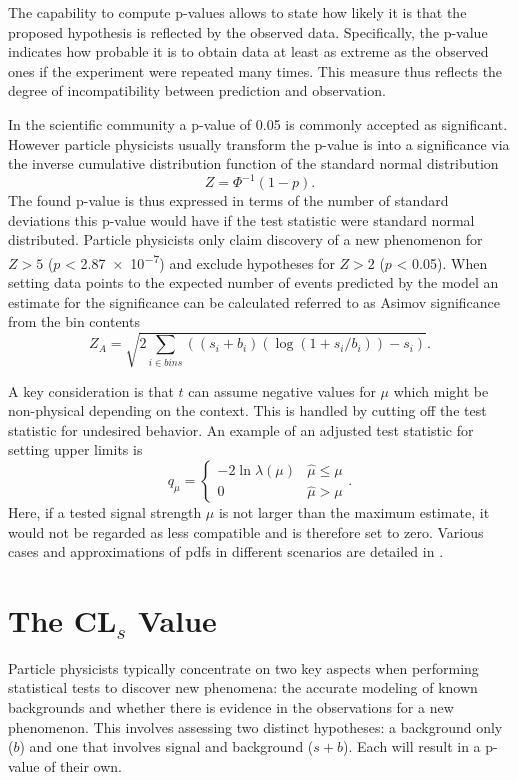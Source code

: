 The capability to compute p-values allows to state how likely it is that the proposed hypothesis is reflected by the observed data. Specifically, the p-value indicates how probable it is to obtain data at least as extreme as the observed ones if the experiment were repeated many times. This measure thus reflects the degree of incompatibility between prediction and observation.

In the scientific community a p-value of 0.05 is commonly accepted as significant. However particle physicists usually transform the p-value is into a significance via the inverse cumulative distribution function of the standard normal distribution
\begin{equation}
    Z = \Phi^{-1}(1 - p).
\end{equation}
The found p-value is thus expressed in terms of the number of standard deviations this p-value would have if the test statistic were standard normal distributed. Particle physicists only claim discovery of a new phenomenon for $Z>5$ ($p$ < \qty{2.87e-7}{}) and exclude hypotheses for $Z>2$ ($p$ < 0.05). When setting data points to the expected number of events predicted by the model an estimate for the significance can be calculated referred to as Asimov significance from the bin contents
\begin{equation}\label{eq:asimov-significance}
    Z_A = \sqrt{2\sum_{i\in bins}((s_i + b_i)(\log{(1 + s_i / b_i)}) - s_i)}.
\end{equation}


A key consideration is that $t$ can assume negative values for $\mu$ which might be non-physical depending on the context. This is handled by cutting off the test statistic for undesired behavior. An example of an adjusted test statistic for setting upper limits is
\begin{equation}
    q_\mu=
    \begin{cases}
        -2\ln \lambda(\mu) & \hat{\mu}\leq\mu \\
        0                  & \hat{\mu}> \mu
    \end{cases}.
\end{equation}
Here, if a tested signal strength $\mu$ is not larger than the maximum estimate, it would not be regarded as less compatible and is therefore set to zero. Various cases and approximations of \acp{pdf} in different scenarios are detailed in \citep{cowan2011asymptotic}.

\section{The CL$_s$ Value}\label{sec:cls}
Particle physicists typically concentrate on two key aspects when performing statistical tests to discover new phenomena: the accurate modeling of known backgrounds and whether there is evidence in the observations for a new phenomenon. This involves assessing two distinct hypotheses: a background only ($b$) and one that involves signal and background ($s+b$). Each will result in a p-value of their own.

